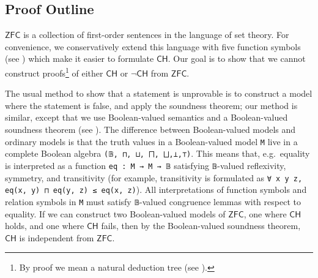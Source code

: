 \documentclass[sigplan,10pt,review, anonymous]{acmart}
\newcommand{\lil}{\lstinline}
\newcommand{\ZFC}{\mathsf{ZFC}}
\newcommand{\CH}{\mathsf{CH}}
\theoremstyle{definition}
\begin{document}


\subsection{Proof Outline}
\label{subsect:intro:outline}
$\ZFC$ is a collection of first-order sentences in the language of set theory. For convenience, we conservatively extend this language with five function symbols (see ) which make it easier to formulate $\CH$. Our goal is to show that we cannot construct proofs\footnote{By proof we mean a natural deduction tree (see ).} of either $\CH$ or $\neg\CH$ from $\ZFC$.

The usual method to show that a statement is unprovable is to construct a model where the statement is false, and apply the soundness theorem; our method is similar, except that we use Boolean-valued semantics and a Boolean-valued soundness theorem (see ).
The difference between Boolean-valued models and ordinary models is that the truth values in a Boolean-valued model \lil{M} live in a complete Boolean algebra \lil{(𝔹, ⊓, ⊔, ⨅, ⨆,⊥,⊤)}.
This means that, e.g.\ equality is interpreted as a function \lil{eq : M → M → 𝔹} satisfying \lil{𝔹}-valued reflexivity, symmetry, and transitivity (for example, transitivity is formulated as \lil{∀ x y z, eq(x, y) ⊓ eq(y, z) ≤ eq(x, z)}).
All interpretations of function symbols and relation symbols in \lil{M} must satisfy \lil{𝔹}-valued congruence lemmas with respect to equality.
If we can construct two Boolean-valued models of $\ZFC$, one where $\CH$ holds, and one where $\CH$ fails, then by the Boolean-valued soundness theorem, $\CH$ is independent from $\ZFC$.
\end{document}
